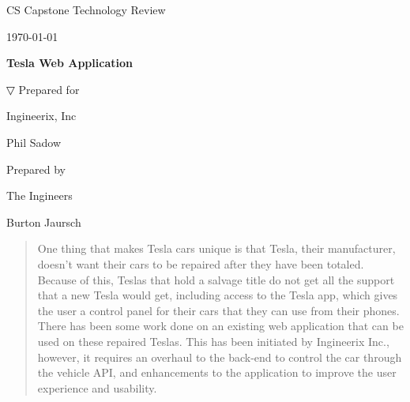 \documentclass[onecolumn, draftclsnofoot,10pt, compsoc]{IEEEtran}
\def \CapstoneTeamName{                 The Ingineers}
\def \CapstoneTeamNumber{               22}
\def \GroupMemberOne{                   Brett Case}
\def \GroupMemberTwo{                   Alexander Morefield}
\def \GroupMemberThree{                 James Zeng}
\def \GroupMemberFour{                  Christopher Jansen}
\def \GroupMemberFive{                  Burton Jaursch}
\def \CapstoneProjectName{              Tesla Web Application}
\def \CapstoneSponsorCompany{           Ingineerix, Inc}
\def \CapstoneSponsorPerson{            Phil Sadow}
\def \DocType{                  %
                                Technology Review
                                }
\newcommand{\NameSigPair}[1]{\par
\makebox[2.75in][r]{#1} \hfil   \makebox[3.25in]{\makebox[2.25in]{\hrulefill} \hfill            \makebox[.75in]{\hrulefill}}
\par\vspace{-12pt} \textit{\tiny\noindent
\makebox[2.75in]{} \hfil                \makebox[3.25in]{\makebox[2.25in][r]{Signature} \hfill  \makebox[.75in][r]{Date}}}}
\renewcommand{\NameSigPair}[1]{#1}
\begin{document}
\begin{titlepage}
    \begin{singlespace}
        \hfill
        \par\vspace{.2in}
        \centering
        \scshape{
            \huge CS Capstone \DocType \par
            {\large\today}\par
            \vspace{.5in}
            \textbf{\Huge\CapstoneProjectName}\par
            \vfill

▽
            \vfill
            {\large Prepared for}\par
            \Huge \CapstoneSponsorCompany\par
            \vspace{5pt}
            {\Large\NameSigPair{\CapstoneSponsorPerson}\par}
            {\large Prepared by }\par
             \CapstoneTeamName\par
            \vspace{5pt}
            {\Large
                \NameSigPair{\GroupMemberFive}\par
            }
            \vspace{20pt}
        }
        \begin{abstract}
        One thing that makes Tesla cars unique is that Tesla, their manufacturer, doesn't want their cars to be repaired after they have been totaled.
        Because of this, Teslas that hold a salvage title do not get all the support that a new Tesla would get, including access to the Tesla app, which gives the user a control panel for their cars that they can use from their phones.
        There has been some work done on an existing web application that can be used on these repaired Teslas.
        This has been initiated by Ingineerix Inc., however, it requires an overhaul to the back-end to control the car through the vehicle API, and enhancements to the application to improve the user experience and usability.
        \end{abstract}
    \end{singlespace}
\end{titlepage}
\newpage
{}
\tableofcontents
\clearpage
\end{document}
